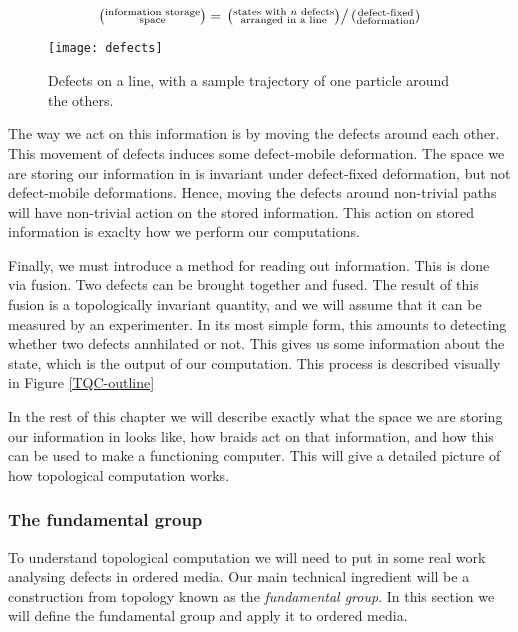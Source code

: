 \begin{equation*}
\left(\substack{
\text{information storage} \\ \text{space}}\right)
=
\left.\left(\substack{
\text{states with $n$ defects} \\ \text{arranged in a line}}\right)\right/
\left(\substack{
\text{defect-fixed} \\ \text{deformation}}\right)
\end{equation*}

\begin{figure}
\begin{center}
\texttt{[image: defects]}
\caption{Defects on a line, with a sample trajectory of one particle around the others.}
\label{defects}
\end{center}
\end{figure}

The way we act on this information is by moving the defects around each other. This movement of defects induces some defect-mobile deformation. The space we are storing our information in is invariant under defect-fixed deformation, but not defect-mobile deformations. Hence, moving the defects around non-trivial paths will have non-trivial action on the stored information. This action on stored information is exaclty how we perform our computations.

Finally, we must introduce a method for reading out information. This is done via fusion. Two defects can be brought together and fused. The result of this fusion is a topologically invariant quantity, and we will assume that it can be measured by an experimenter. In its most simple form, this amounts to detecting whether two defects annhilated or not.  This gives us some information about the state, which is the output of our computation. This process is described visually in Figure \ref{TQC-outline}

In the rest of this chapter we will describe exactly what the space we are storing our information in looks like, how braids act on that information, and how this can be used to make a functioning computer. This will give a detailed picture of how topological computation works.

\subsubsection{The fundamental group}
\label{the-fundamental-group}

To understand topological computation we will need to put in some real work analysing defects in ordered media. Our main technical ingredient will be a construction from topology known as the {\em fundamental group}. In this section we will define the fundamental group and apply it to ordered media.

